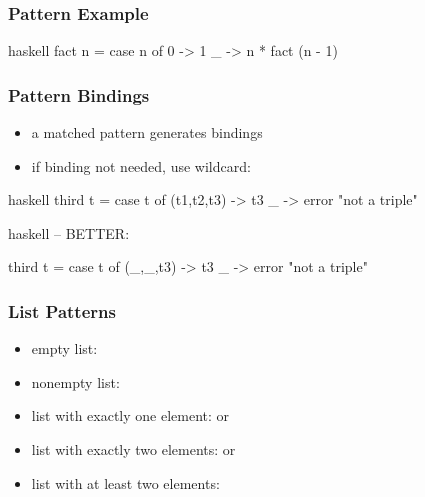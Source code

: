 \documentclass[dvipsnames]{beamer}
\theoremstyle{plain}
\begin{document}
\begin{frame}[fragile]
  \frametitle{Pattern Example}

  \begin{example}[factorial]
    \begin{pygments}{haskell}
fact n =
    case n of
      0 -> 1
      _ -> n * fact (n - 1)
    \end{pygments}
  \end{example}
\end{frame}

\begin{frame}[fragile]
  \frametitle{Pattern Bindings}

  \begin{itemize}
    \item a matched pattern generates bindings
    \item if binding not needed, use wildcard: 
  \end{itemize}

  \pause
  \begin{example}
    \begin{pygments}{haskell}
third t =
    case t of
      (t1,t2,t3) -> t3
      _ -> error "not a triple"
    \end{pygments}

    \pause
    \begin{pygments}{haskell}
-- BETTER:

third t =
    case t of
      (_,_,t3) -> t3
      _ -> error "not a triple"
    \end{pygments}
  \end{example}
\end{frame}

\begin{frame}[fragile]
  \frametitle{List Patterns}

  \begin{itemize}
    \item empty list: 
    \item nonempty list: 
    \item list with exactly one element:  or
    \item list with exactly two elements:  or
    \item list with at least two elements: 
  \end{itemize}
\end{frame}
\end{document}
